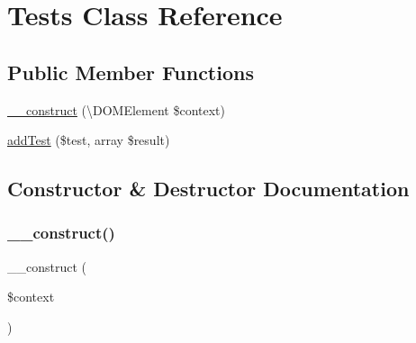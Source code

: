 \hypertarget{class_sebastian_bergmann_1_1_code_coverage_1_1_report_1_1_xml_1_1_tests}{}\section{Tests Class Reference}
\label{class_sebastian_bergmann_1_1_code_coverage_1_1_report_1_1_xml_1_1_tests}
\subsection*{Public Member Functions}
\begin{DoxyCompactItemize}
\item 
\mbox{\hyperlink{class_sebastian_bergmann_1_1_code_coverage_1_1_report_1_1_xml_1_1_tests_a3d40077fdf18089a879b71420d43633c}{\+\_\+\+\_\+construct}} (\textbackslash{}D\+O\+M\+Element \$context)
\item 
\mbox{\hyperlink{class_sebastian_bergmann_1_1_code_coverage_1_1_report_1_1_xml_1_1_tests_a70985211a57ffa53b9d4c50b98fc70cc}{add\+Test}} (\$test, array \$result)
\end{DoxyCompactItemize}


\subsection{Constructor \& Destructor Documentation}
\mbox{\label{class_sebastian_bergmann_1_1_code_coverage_1_1_report_1_1_xml_1_1_tests_a3d40077fdf18089a879b71420d43633c}} 
\subsubsection{\texorpdfstring{\+\_\+\+\_\+construct()}{\_\_construct()}}
{\footnotesize\ttfamily \+\_\+\+\_\+construct (\begin{DoxyParamCaption}\item[{\textbackslash{}D\+O\+M\+Element}]{\$context }\end{DoxyParamCaption})}



